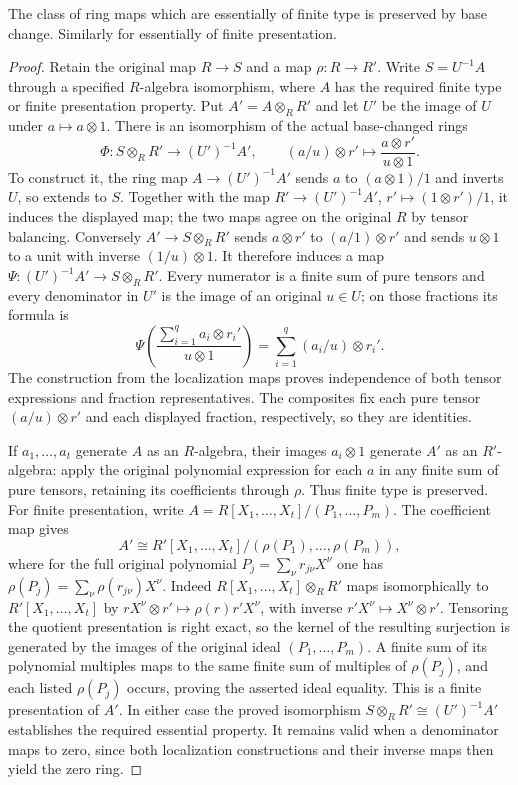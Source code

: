 \begin{lemma}
\label{lemma-base-change-essentially-of-finite-type}
The class of ring maps which are essentially of finite type is
preserved by base change. Similarly for essentially of finite
presentation.
\end{lemma}

\begin{proof}
Retain the original map $R\to S$ and a map $\rho:R\to R'$.
Write $S=U^{-1}A$ through a specified $R$-algebra isomorphism,
where $A$ has the required finite type or finite presentation
property. Put $A'=A\otimes_R R'$ and let $U'$ be the image
of $U$ under $a\mapsto a\otimes1$.
There is an isomorphism of the actual base-changed rings
$$
\Phi:S\otimes_R R'\longrightarrow (U')^{-1}A',
\qquad
(a/u)\otimes r'\longmapsto
\frac{a\otimes r'}{u\otimes1}.
$$
To construct it, the ring map $A\to(U')^{-1}A'$ sends
$a$ to $(a\otimes1)/1$ and inverts $U$, so extends to $S$.
Together with the map $R'\to(U')^{-1}A'$,
$r'\mapsto(1\otimes r')/1$, it induces the displayed map;
the two maps agree on the original $R$ by tensor balancing.
Conversely $A'\to S\otimes_R R'$ sends
$a\otimes r'$ to $(a/1)\otimes r'$ and sends $u\otimes1$
to a unit with inverse $(1/u)\otimes1$.
It therefore induces a map $\Psi:(U')^{-1}A'\to S\otimes_R R'$.
Every numerator is a finite sum of pure tensors and every
denominator in $U'$ is the image of an original $u\in U$;
on those fractions its formula is
$$
\Psi\left(\frac{\sum_{i=1}^q a_i\otimes r_i'}{u\otimes1}\right)
=\sum_{i=1}^q(a_i/u)\otimes r_i'.
$$
The construction from the localization maps proves independence
of both tensor expressions and fraction representatives.
The composites fix each pure tensor $(a/u)\otimes r'$ and
each displayed fraction, respectively, so they are identities.

If $a_1,\ldots,a_t$ generate $A$ as an $R$-algebra, their
images $a_i\otimes1$ generate $A'$ as an $R'$-algebra:
apply the original polynomial expression for each $a$ in any
finite sum of pure tensors, retaining its coefficients through
$\rho$. Thus finite type is preserved.
For finite presentation, write
$A=R[X_1,\ldots,X_t]/(P_1,\ldots,P_m)$.
The coefficient map gives
$$
A'\cong R'[X_1,\ldots,X_t]/(\rho(P_1),\ldots,\rho(P_m)),
$$
where for the full original polynomial
$P_j=\sum_\nu r_{j\nu}X^\nu$ one has
$\rho(P_j)=\sum_\nu\rho(r_{j\nu})X^\nu$.
Indeed $R[X_1,\ldots,X_t]\otimes_R R'$ maps isomorphically
to $R'[X_1,\ldots,X_t]$ by
$rX^\nu\otimes r'\mapsto\rho(r)r'X^\nu$, with inverse
$r'X^\nu\mapsto X^\nu\otimes r'$.
Tensoring the quotient presentation is right exact, so the
kernel of the resulting surjection is generated by the images
of the original ideal $(P_1,\ldots,P_m)$.
A finite sum of its polynomial multiples maps to the same
finite sum of multiples of $\rho(P_j)$, and each listed
$\rho(P_j)$ occurs, proving the asserted ideal equality.
This is a finite presentation of $A'$.
In either case the proved isomorphism $S\otimes_R R'\cong
(U')^{-1}A'$ establishes the required essential property.
It remains valid when a denominator maps to zero, since both
localization constructions and their inverse maps then yield
the zero ring.
\end{proof}